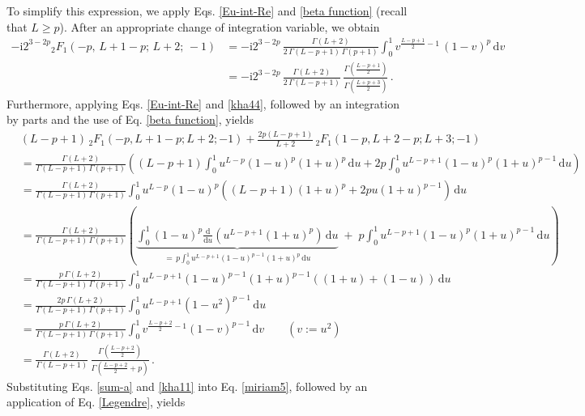\documentclass[aps,twocolumn,nofootinbib]{revtex4}
\begin{document}
{\begin{appendix}
\begin{widetext}
To simplify this expression, we apply Eqs. \eqref{Eu-int-Re} and \eqref{beta function} (recall that $L\geqslant p$). After an appropriate change of integration variable, we obtain
\begin{align}\label{sum-a}
    -\mathrm{i} 2^{3-2p} {}_2F_1^{}(-p,\, L+1-p;\, L+2;\, -1) &= -\mathrm{i} 2^{3-2p}\, \frac{\Gamma(L+2)}{2\, \Gamma(L-p+1)\, \Gamma(p+1)}\int_0^1 v^{\frac{L-p+1}{2}-1}\, (1-v)^p\,\mathrm{d}v\nonumber\\[3pt]
    &= -\mathrm{i} 2^{3-2p}\, \frac{\Gamma(L+2)}{2\,\Gamma(L-p+1)} \,\frac{\Gamma\left(\frac{L-p+1}{2}\right)}{\Gamma\left(\frac{L+p+3}{2}\right)} \,.
\end{align}
Furthermore, applying Eqs. \eqref{Eu-int-Re} and \eqref{kha44}, followed by an integration by parts and the use of Eq. \eqref{beta function}, yields
\begin{align}\label{kha11}
    & (L-p+1)\, {}_2F_1(-p, L+1-p; L+2; -1) + \frac{2p(L-p+1)}{L+2}\, {}_2F_1(1-p, L+2-p; L+3; -1) \nonumber\\[3pt]
    &= \frac{\Gamma(L+2)}{\Gamma(L-p+1)\, \Gamma(p+1)}
    \left((L-p+1)\int_0^1 u^{L-p} (1-u)^p (1+u)^p\,\mathrm{d}u + 2p\int_0^1 u^{L-p+1}(1-u)^p(1+u)^{p-1}\,\mathrm{d}u\right) \nonumber\\[3pt]
    &= \frac{\Gamma(L+2)}{\Gamma(L-p+1)\, \Gamma(p+1)}\int_0^1u^{L-p}(1-u)^p\left((L-p+1)(1+u)^p+2pu(1+u)^{p-1}\right)\,\mathrm{d}u \nonumber\\[3pt]
    &= \frac{\Gamma(L+2)}{\Gamma(L-p+1)\, \Gamma(p+1)}\left( \underbrace{\int_0^1(1-u)^p\frac{\mathrm{d}}{\mathrm{d}u}\left(u^{L-p+1}(1+u)^p\right)\,\mathrm{d}u}_{=\, p\int_0^1 u^{L-p+1}(1-u)^{p-1}(1+u)^p\,\mathrm{d}u} \;+\; p\int_0^1 u^{L-p+1}(1-u)^p(1+u)^{p-1}\, \mathrm{d}u\right) \nonumber\\[3pt]
    &= \frac{p\,\Gamma(L+2)}{\Gamma(L-p+1)\, \Gamma(p+1)}\int_0^1 u^{L-p+1}(1-u)^{p-1}(1+u)^{p-1}\left((1+u)+(1-u)\right)\,\mathrm{d}u \nonumber\\[3pt]
    &= \frac{2p\,\Gamma(L+2)}{\Gamma(L-p+1)\, \Gamma(p+1)}\int_0^1 u^{L-p+1}(1-u^2)^{p-1}\,\mathrm{d}u \nonumber\\[3pt]
    &= \frac{p\,\Gamma(L+2)}{\Gamma(L-p+1)\, \Gamma(p+1)}\int_0^1 v^{\frac{L-p+2}{2}-1}(1-v)^{p-1}\,\mathrm{d}v \qquad (v:=u^2) \nonumber\\[3pt]
    &= \frac{\Gamma(L+2)}{\Gamma(L-p+1)}\, \frac{\Gamma\!\left(\frac{L-p+2}{2}\right)}{\Gamma\!\left(\frac{L-p+2}{2}+p\right)}\,.
\end{align}
Substituting Eqs. \eqref{sum-a} and \eqref{kha11} into Eq. \eqref{miriam5}, followed by an application of Eq. \eqref{Legendre}, yields

\end{widetext}
\end{appendix}}
\end{document}
